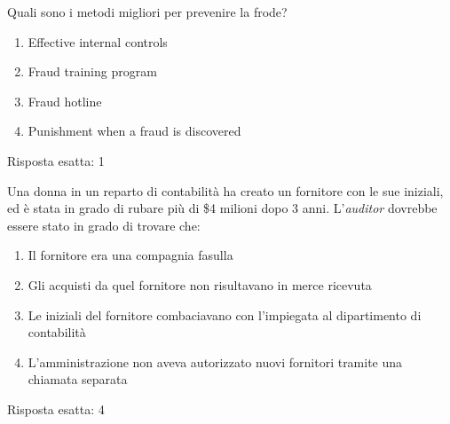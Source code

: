 \label{EsFrodi2}

\begin{Exercise} [
  title={Prevenzione di una frode},
  label={fr4}
 ]

 \Question Quali sono i metodi migliori per prevenire la frode?
\begin{enumerate}
  \item Effective internal controls
  \item Fraud training program
  \item Fraud hotline
  \item Punishment when a fraud is discovered
\end{enumerate}

\end{Exercise}

\begin{Answer} [
   ref={fr4},
   number={4}
 ]

  \Question Risposta esatta: 1

\end{Answer}


\begin{Exercise} [
  title={Prevenzione di una frode},
  label={fr5}
 ]

 \Question Una donna in un reparto di contabilità ha creato un fornitore con le
sue iniziali, ed è stata in grado di rubare più di \$4 milioni dopo 3 anni.
L'\textit{auditor} dovrebbe essere stato in grado di trovare che:
\begin{enumerate}
 \item Il fornitore era una compagnia fasulla
 \item Gli acquisti da quel fornitore non risultavano in merce ricevuta
 \item Le iniziali del fornitore combaciavano con l'impiegata al dipartimento
di contabilità
 \item L'amministrazione non aveva autorizzato nuovi fornitori tramite una
chiamata separata
\end{enumerate}

\end{Exercise}

\begin{Answer} [
  ref={fr5},
  number={5}
 ]

 \Question Risposta esatta: 4
\end{Answer}





